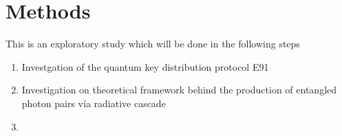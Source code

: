\section{Methods}

This is an exploratory study which will be done in the following steps


\begin{enumerate}
	\item Investgation of the quantum key distribution protocol E91
	
	\item Investigation on  theoretical framework behind the production of entangled photon pairs vía radiative cascade
	
	\item 
\end{enumerate}